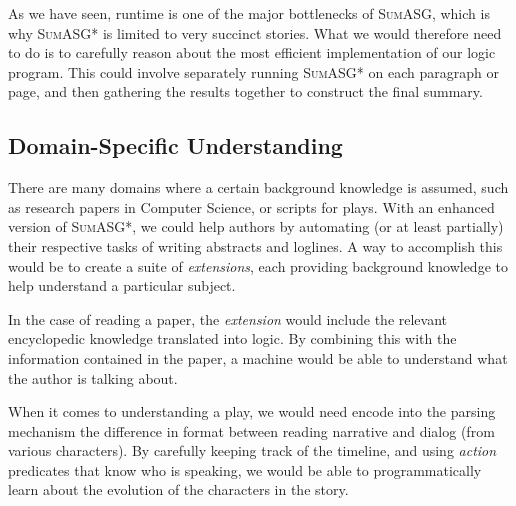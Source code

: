 As we have seen, runtime is one of the major bottlenecks of \textsc{SumASG}, which is why \textsc{SumASG*} is limited to very succinct stories. What we would therefore need to do is to carefully reason about the most efficient implementation of our logic program. This could involve separately running \textsc{SumASG*} on each paragraph or page, and then gathering the results together to construct the final summary.

\subsection{Domain-Specific Understanding}

There are many domains where a certain background knowledge is assumed, such as research papers in Computer Science, or scripts for plays. With an enhanced version of \textsc{SumASG*}, we could help authors by automating (or at least partially) their respective tasks of writing abstracts and loglines. A way to accomplish this would be to create a suite of \textit{extensions}, each providing background knowledge to help understand a particular subject.

In the case of reading a paper, the \textit{extension} would include the relevant encyclopedic knowledge translated into logic. By combining this with the information contained in the paper, a machine would be able to understand what the author is talking about.

When it comes to understanding a play, we would need encode into the parsing mechanism the difference in format between reading narrative and dialog (from various characters). By carefully keeping track of the timeline, and using \textit{action} predicates that know who is speaking, we would be able to programmatically learn about the evolution of the characters in the story.
